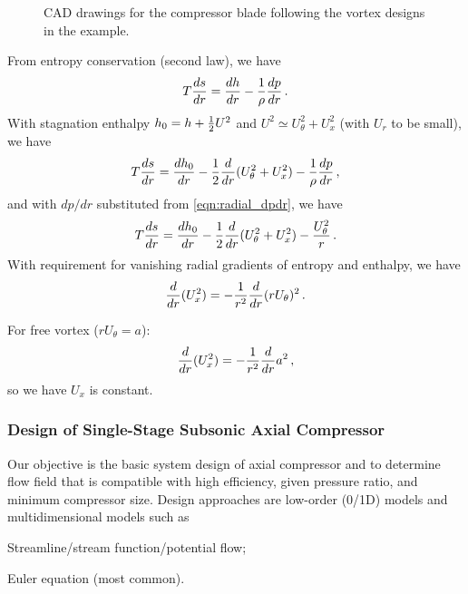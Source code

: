 \begin{figure}[!htb!]
	\centering
	\caption{CAD drawings for the compressor blade following the vortex designs in the example.}
	\label{fig:vortex_design_CAD}
\end{figure}
		

From entropy conservation (second law), we have
\begin{equation}
  T {\frac{ds}{dr}} = {\frac{dh}{dr}} - {\frac{1}{\rho}} {\frac{dp}{dr}}\,.
\end{equation}
With stagnation enthalpy $h_0 = h + {\frac{1}{2}} U^2$ and $U^2 \simeq U_\theta^2 + U_x^2$ (with $U_r$ to be small), we have
\begin{equation}
  T {\frac{ds}{dr}} = {\frac{dh_0}{dr}} - {\frac{1}{2}} {\frac{d}{dr}} (U_\theta^2 + U_x^2) -  {\frac{1}{\rho}} {\frac{dp}{dr}}\,,
\end{equation}
and with $dp/dr$ substituted from \cref{eqn:radial_dpdr}, we have
\begin{equation}
  T {\frac{ds}{dr}} = {\frac{dh_0}{dr}} - {\frac{1}{2}} {\frac{d}{dr}} (U_\theta^2 + U_x^2) -  {\frac{U_\theta^2}{r}}\,.
\end{equation}
With requirement for vanishing radial gradients of entropy and enthalpy, we have
\begin{equation}
  \label{eqn:radial_equilibrium}
  {\frac{d}{dr}} (U_x^2) = - {\frac{1}{r^2}} {\frac{d}{dr}} (r U_\theta)^2\,.
\end{equation}

For free vortex ($rU_\theta = a$):
\[
  {\frac{d}{dr}} (U_x^2) = - {\frac{1}{r^2}} {\frac{d}{dr}} a^2 \,,
\]
so we have $U_x$ is constant.

\subsubsection{Design of Single-Stage Subsonic Axial Compressor}
Our objective is the basic system design of axial compressor and to determine flow field that is compatible with high efficiency, given pressure ratio, and minimum compressor size. Design approaches are low-order (0/1D) models and multidimensional models such as
\begin{itemizePacked}
\item Streamline/stream function/potential flow;
\item Euler equation (most common).
\end{itemizePacked}

